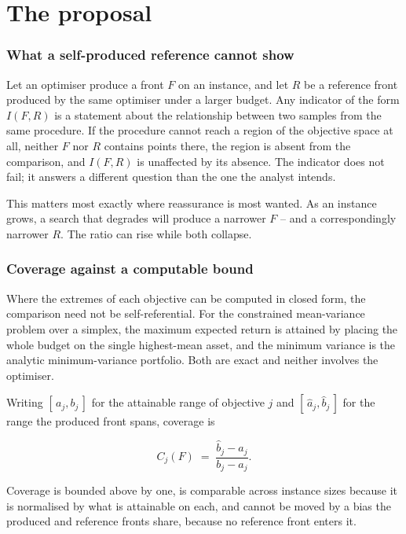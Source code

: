 \documentclass[preprint,11pt,authoryear]{elsarticle}
\begin{document}
\section{The proposal}\label{sec:the-proposal}

\subsubsection{What a self-produced reference cannot show}

Let an optimiser produce a front $F$ on an instance, and let $R$ be a reference front produced by the same optimiser under a larger budget. Any indicator of the form $I(F, R)$ is a statement about the relationship between two samples from the same procedure. If the procedure cannot reach a region of the objective space at all, neither $F$ nor $R$ contains points there, the region is absent from the comparison, and $I(F, R)$ is unaffected by its absence. The indicator does not fail; it answers a different question than the one the analyst intends.

This matters most exactly where reassurance is most wanted. As an instance grows, a search that degrades will produce a narrower $F$ -- and a correspondingly narrower $R$. The ratio can rise while both collapse.

\subsubsection{Coverage against a computable bound}

Where the extremes of each objective can be computed in closed form, the comparison need not be self-referential. For the constrained mean-variance problem over a simplex, the maximum expected return is attained by placing the whole budget on the single highest-mean asset, and the minimum variance is the analytic minimum-variance portfolio. Both are exact and neither involves the optimiser.

Writing $[\,a_j, b_j\,]$ for the attainable range of objective $j$ and $[\,\hat{a}_j, \hat{b}_j\,]$ for the range the produced front spans, coverage is

\begin{equation}
  C_j(F) \;=\; \frac{\hat{b}_j - \hat{a}_j}{b_j - a_j}.
\end{equation}

Coverage is bounded above by one, is comparable across instance sizes because it is normalised by what is attainable on each, and cannot be moved by a bias the produced and reference fronts share, because no reference front enters it.
\end{document}
